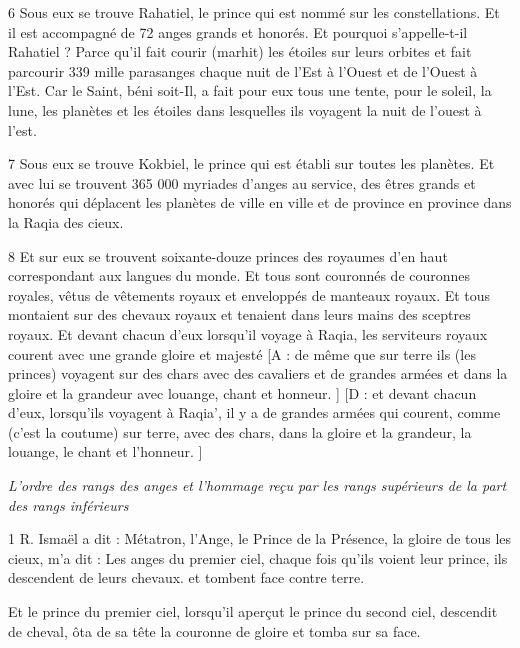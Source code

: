 \par 6 Sous eux se trouve Rahatiel, le prince qui est nommé sur les constellations. Et il est accompagné de 72 anges grands et honorés. Et pourquoi s'appelle-t-il Rahatiel ? Parce qu'il fait courir (marhit) les étoiles sur leurs orbites et fait parcourir 339 mille parasanges chaque nuit de l'Est à l'Ouest et de l'Ouest à l'Est. Car le Saint, béni soit-Il, a fait pour eux tous une tente, pour le soleil, la lune, les planètes et les étoiles dans lesquelles ils voyagent la nuit de l'ouest à l'est.

\par 7 Sous eux se trouve Kokbiel, le prince qui est établi sur toutes les planètes. Et avec lui se trouvent 365 000 myriades d'anges au service, des êtres grands et honorés qui déplacent les planètes de ville en ville et de province en province dans la Raqia des cieux.

\par 8 Et sur eux se trouvent soixante-douze princes des royaumes d'en haut correspondant aux langues du monde. Et tous sont couronnés de couronnes royales, vêtus de vêtements royaux et enveloppés de manteaux royaux. Et tous montaient sur des chevaux royaux et tenaient dans leurs mains des sceptres royaux. Et devant chacun d'eux lorsqu'il voyage à Raqia, les serviteurs royaux courent avec une grande gloire et majesté [A : de même que sur terre ils (les princes) voyagent sur des chars avec des cavaliers et de grandes armées et dans la gloire et la grandeur avec louange, chant et honneur. ] [D : et devant chacun d'eux, lorsqu'ils voyagent à Raqia', il y a de grandes armées qui courent, comme (c'est la coutume) sur terre, avec des chars, dans la gloire et la grandeur, la louange, le chant et l'honneur. ]



\par \textit{L'ordre des rangs des anges et l'hommage reçu par les rangs supérieurs de la part des rangs inférieurs}

\par 1 R. Ismaël a dit : Métatron, l'Ange, le Prince de la Présence, la gloire de tous les cieux, m'a dit : Les anges du premier ciel, chaque fois qu'ils voient leur prince, ils descendent de leurs chevaux. et tombent face contre terre.

\par Et le prince du premier ciel, lorsqu'il aperçut le prince du second ciel, descendit de cheval, ôta de sa tête la couronne de gloire et tomba sur sa face.

